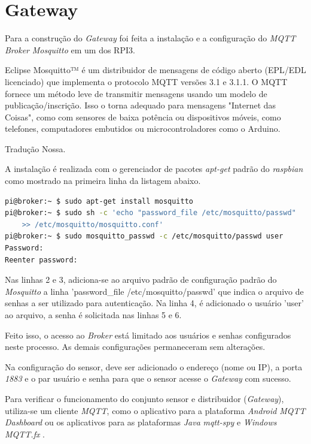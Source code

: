 \section{Gateway}
\label{sec:app-gw}

Para a construção do \emph{Gateway} foi feita a instalação e a configuração do
\emph{MQTT Broker} \emph{Mosquitto} em um dos RPI3.

\begin{citacao}

	Eclipse Mosquitto™ é um distribuidor de mensagens de código aberto (EPL/EDL
	licenciado) que implementa o protocolo MQTT versões 3.1 e 3.1.1. O MQTT
	fornece um método leve de transmitir mensagens usando um modelo de
	publicação/inscrição. Isso o torna adequado para mensagens "Internet das
	Coisas", como com sensores de baixa potência ou dispositivos móveis, como
	telefones, computadores embutidos ou microcontroladores como o Arduino. \

	 Tradução Nossa.
\end{citacao}


A instalação é realizada com o gerenciador de pacotes \emph{apt-get} padrão do
\emph{raspbian} como mostrado na primeira linha da listagem abaixo.

\begin{lstlisting}[language=bash]
pi@broker:~ $ sudo apt-get install mosquitto
pi@broker:~ $ sudo sh -c 'echo "password_file /etc/mosquitto/passwd"
	>> /etc/mosquitto/mosquitto.conf'
pi@broker:~ $ sudo mosquitto_passwd -c /etc/mosquitto/passwd user
Password:
Reenter password:
\end{lstlisting}

Nas linhas 2 e 3, adiciona-se ao arquivo padrão de configuração padrão do
\emph{Mosquitto} a linha 'password\_file /etc/mosquitto/passwd' que
indica o arquivo de senhas a ser utilizado para autenticação. Na linha 4, é
adicionado o usuário 'user' ao arquivo, a senha é solicitada  nas
linhas 5 e 6.

Feito isso, o acesso ao \emph{Broker} está limitado aos usuários e senhas
configurados neste processo. As demais configurações permaneceram sem alterações.

Na configuração do sensor, deve ser adicionado o endereço (nome ou IP), a porta
\emph{1883} e o par usuário e senha para que o sensor acesse o \emph{Gateway} com
sucesso.

Para verificar o funcionamento do conjunto sensor e distribuidor (\emph{Gateway}), utiliza-se um
cliente \emph{MQTT}, como o aplicativo para a plataforma \emph{Android} \emph{MQTT Dashboard}
\cite{mqttdash} ou os aplicativos para as plataformas \emph{Java} \emph{mqtt-spy}
\cite{mqttspy} e \emph{Windows} \emph{MQTT.fx} \cite{mqttfx}.

